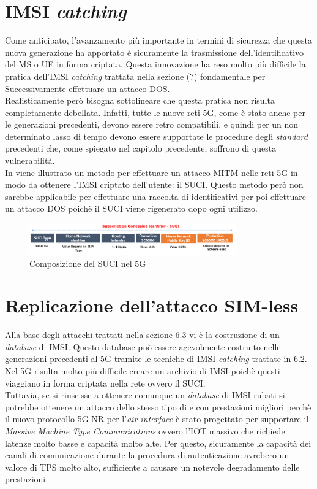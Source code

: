 \section{IMSI \textit{catching}}
Come anticipato, l'avanzamento più importante in termini di sicurezza che questa nuova generazione ha apportato è sicuramente la trasmissione dell'identificativo del MS o UE in forma 
criptata. Questa innovazione ha reso molto più difficile la pratica dell'IMSI \textit{catching} trattata nella sezione (?) fondamentale per Successivamente effettuare un attacco DOS.\\
Realisticamente però bisogna sottolineare che questa pratica non risulta completamente debellata. Infatti, tutte le nuove reti 5G, come è stato anche per le generazioni precedenti, devono 
essere retro compatibili, e quindi per un non determinato lasso di tempo devono essere supportate le procedure degli \textit{standard} precedenti che, come spiegato nel capitolo precedente, soffrono 
di questa vulnerabilità.\\
In \cite{suci-catch} viene illustrato un metodo per effettuare un attacco MITM nelle reti 5G in modo da ottenere l'IMSI criptato dell'utente: il SUCI. Questo metodo però non sarebbe applicabile per effettuare 
una raccolta di identificativi per poi effettuare un attacco DOS poichè il SUCI viene rigenerato dopo ogni utilizzo.
\begin{figure}[ht]
    \centering
    \includegraphics[width=0.8\textwidth]{images/5g-suci.png}
    \caption{Composizione del SUCI nel 5G}
\end{figure}

\clearpage

\section{Replicazione dell'attacco SIM-less}
Alla base degli attacchi trattati nella sezione 6.3 vi è la costruzione di un \textit{database} di IMSI. Questo database può essere agevolmente costruito nelle generazioni precedenti al 5G 
tramite le tecniche di IMSI \textit{catching} trattate in 6.2. Nel 5G risulta molto più difficile creare un archivio di IMSI poichè questi viaggiano in forma criptata nella rete ovvero il SUCI.\\
Tuttavia, se si riuscisse a ottenere comunque un \textit{database} di IMSI rubati si potrebbe ottenere un attacco dello stesso tipo di \cite{gsm-dos-simless} e \cite{umts-dos} con prestazioni migliori 
perchè il nuovo protocollo 5G NR\cite{5g-nr} per l'\textit{air interface} è stato progettato per supportare il \textit{Massive Machine Type Communications} ovvero l'IOT massivo che richiede latenze molto basse e capacità molto alte.
Per questo, sicuramente la capacità dei canali di comunicazione durante la procedura di autenticazione avrebero un valore di TPS molto alto, sufficiente a causare un notevole degradamento delle prestazioni.

